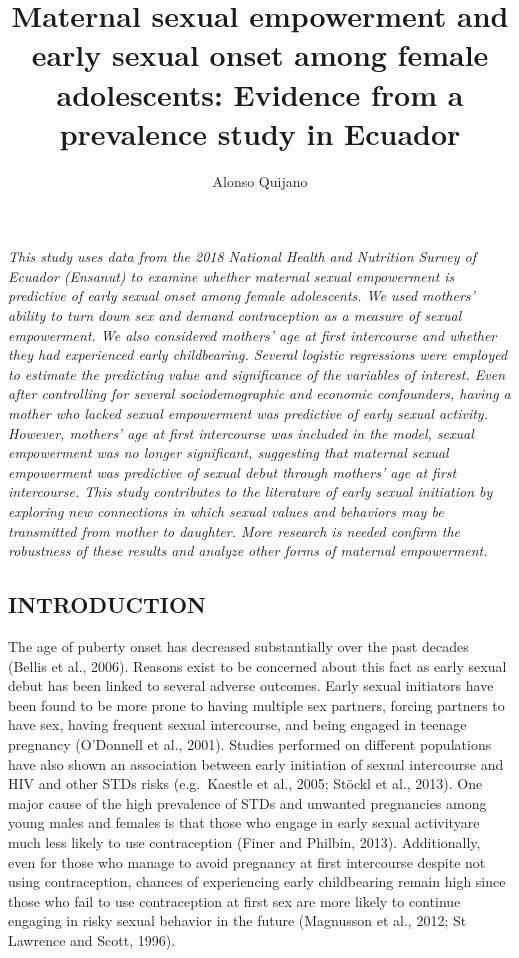 \documentclass[
]{article}
\title{Maternal sexual empowerment and early sexual onset among female
adolescents: Evidence from a prevalence study in Ecuador}
\author{Alonso Quijano}
\date{}
\begin{document}
\maketitle

\emph{This study uses data from the 2018 National Health and Nutrition
Survey of Ecuador (Ensanut) to examine whether maternal sexual
empowerment is predictive of early sexual onset among female
adolescents. We used mothers' ability to turn down sex and demand
contraception as a measure of sexual empowerment. We also considered
mothers' age at first intercourse and whether they had experienced early
childbearing. Several logistic regressions were employed to estimate the
predicting value and significance of the variables of interest. Even
after controlling for several sociodemographic and economic confounders,
having a mother who lacked sexual empowerment was predictive of early
sexual activity. However, mothers' age at first intercourse was included
in the model, sexual empowerment was no longer significant, suggesting
that maternal sexual empowerment was predictive of sexual debut through
mothers' age at first intercourse. This study contributes to the
literature of early sexual initiation by exploring new connections in
which sexual values and behaviors may be transmitted from mother to
daughter. More research is needed confirm the robustness of these
results and analyze other forms of maternal empowerment.}

\hypertarget{introduction}{%
\subsection{INTRODUCTION}\label{introduction}}

The age of puberty onset has decreased substantially over the past
decades (Bellis et al., 2006). Reasons exist to be concerned about this
fact as early sexual debut has been linked to several adverse outcomes.
Early sexual initiators have been found to be more prone to having
multiple sex partners, forcing partners to have sex, having frequent
sexual intercourse, and being engaged in teenage pregnancy (O'Donnell et
al., 2001). Studies performed on different populations have also shown
an association between early initiation of sexual intercourse and HIV
and other STDs risks (e.g.~Kaestle et al., 2005; Stöckl et al., 2013).
One major cause of the high prevalence of STDs and unwanted pregnancies
among young males and females is that those who engage in early sexual
activityare much less likely to use contraception (Finer and Philbin,
2013). Additionally, even for those who manage to avoid pregnancy at
first intercourse despite not using contraception, chances of
experiencing early childbearing remain high since those who fail to use
contraception at first sex are more likely to continue engaging in risky
sexual behavior in the future (Magnusson et al., 2012; St Lawrence and
Scott, 1996).
\end{document}
